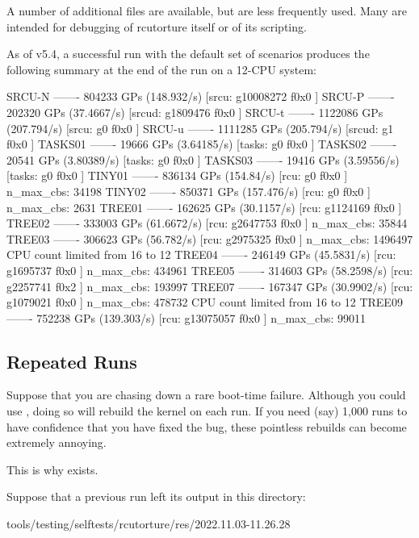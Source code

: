 A number of additional files are available, but are less frequently used.
Many are intended for debugging of rcutorture itself or of its scripting.

As of v5.4, a successful run with the default set of scenarios produces
the following summary at the end of the run on a 12-CPU system:

\begin{VerbatimU}[fontsize=\tiny]
    SRCU-N ------- 804233 GPs (148.932/s) [srcu: g10008272 f0x0 ]
    SRCU-P ------- 202320 GPs (37.4667/s) [srcud: g1809476 f0x0 ]
    SRCU-t ------- 1122086 GPs (207.794/s) [srcu: g0 f0x0 ]
    SRCU-u ------- 1111285 GPs (205.794/s) [srcud: g1 f0x0 ]
    TASKS01 ------- 19666 GPs (3.64185/s) [tasks: g0 f0x0 ]
    TASKS02 ------- 20541 GPs (3.80389/s) [tasks: g0 f0x0 ]
    TASKS03 ------- 19416 GPs (3.59556/s) [tasks: g0 f0x0 ]
    TINY01 ------- 836134 GPs (154.84/s) [rcu: g0 f0x0 ] n_max_cbs: 34198
    TINY02 ------- 850371 GPs (157.476/s) [rcu: g0 f0x0 ] n_max_cbs: 2631
    TREE01 ------- 162625 GPs (30.1157/s) [rcu: g1124169 f0x0 ]
    TREE02 ------- 333003 GPs (61.6672/s) [rcu: g2647753 f0x0 ] n_max_cbs: 35844
    TREE03 ------- 306623 GPs (56.782/s) [rcu: g2975325 f0x0 ] n_max_cbs: 1496497
    CPU count limited from 16 to 12
    TREE04 ------- 246149 GPs (45.5831/s) [rcu: g1695737 f0x0 ] n_max_cbs: 434961
    TREE05 ------- 314603 GPs (58.2598/s) [rcu: g2257741 f0x2 ] n_max_cbs: 193997
    TREE07 ------- 167347 GPs (30.9902/s) [rcu: g1079021 f0x0 ] n_max_cbs: 478732
    CPU count limited from 16 to 12
    TREE09 ------- 752238 GPs (139.303/s) [rcu: g13075057 f0x0 ] n_max_cbs: 99011
\end{VerbatimU}


\subsection{Repeated Runs}

Suppose that you are chasing down a rare boot-time failure.
Although you
could use , doing so will rebuild the kernel on each run.
If you
need (say) 1,000 runs to have confidence that you have fixed the bug,
these pointless rebuilds can become extremely annoying.

This is why  exists.

Suppose that a previous  run left its output in this directory:

\begin{VerbatimU}
	tools/testing/selftests/rcutorture/res/2022.11.03-11.26.28
\end{VerbatimU}

